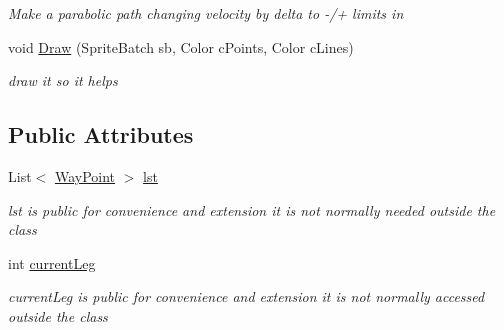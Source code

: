 \begin{DoxyCompactItemize}
\begin{DoxyCompactList}\small\item\em Make a parabolic path changing velocity by delta to -\//+ limits in \end{DoxyCompactList}\item 
void \mbox{\hyperlink{class_r_c___framework_1_1_way_point_list_aefa55485666e631b2ef38e634f8cf27e}{Draw}} (Sprite\+Batch sb, Color c\+Points, Color c\+Lines)
\begin{DoxyCompactList}\small\item\em draw it so it helps \end{DoxyCompactList}\end{DoxyCompactItemize}
\subsection*{Public Attributes}
\begin{DoxyCompactItemize}
\item 
List$<$ \mbox{\hyperlink{class_r_c___framework_1_1_way_point}{Way\+Point}} $>$ \mbox{\hyperlink{class_r_c___framework_1_1_way_point_list_a4d619d6c2ba2451d3a4be093264fd748}{lst}}
\begin{DoxyCompactList}\small\item\em lst is public for convenience and extension it is not normally needed outside the class \end{DoxyCompactList}\item 
int \mbox{\hyperlink{class_r_c___framework_1_1_way_point_list_a2ba972fa03f1cecf550ae7e3a0005131}{current\+Leg}}
\begin{DoxyCompactList}\small\item\em current\+Leg is public for convenience and extension it is not normally accessed outside the class \end{DoxyCompactList}\end{DoxyCompactItemize}
